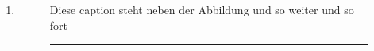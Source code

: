 \documentclass[parskip]{scrartcl}
\begin{document}
\begin{enumerate}
\item \blindtext
%
\begin{figure}
\begin{captionbeside}{Diese caption steht neben der Abbildung und so
weiter und so fort}
 \rule{0.5\linewidth}{10\baselineskip}
\end{captionbeside}
\end{figure}
%
\blindtext
\end{enumerate}
\end{document}
